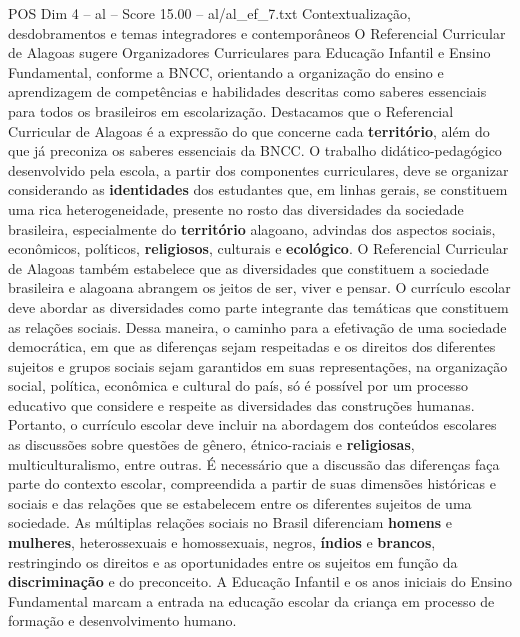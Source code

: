 \begin{textsample}{POS Dim 4 – al – Score 15.00 – al/al\_ef\_7.txt}  \label{ex:f4_pos_049}
Contextualização, desdobramentos e temas integradores e contemporâneos O Referencial Curricular de Alagoas sugere Organizadores Curriculares para Educação Infantil e Ensino Fundamental, conforme a BNCC, orientando a organização do ensino e aprendizagem de competências e habilidades descritas como saberes essenciais para todos os brasileiros em escolarização.
Destacamos que o Referencial Curricular de Alagoas é a expressão do que concerne cada \textbf{território}, além do que já preconiza os saberes essenciais da BNCC.
O trabalho didático-pedagógico desenvolvido pela escola, a partir dos componentes curriculares, deve se organizar considerando as \textbf{identidades} dos estudantes que, em linhas gerais, se constituem uma rica heterogeneidade, presente no rosto das diversidades da sociedade brasileira, especialmente do \textbf{território} alagoano, advindas dos aspectos sociais, econômicos, políticos, \textbf{religiosos}, culturais e \textbf{ecológico}.
O Referencial Curricular de Alagoas também estabelece que as diversidades que constituem a sociedade brasileira e alagoana abrangem os jeitos de ser, viver e pensar.
O currículo escolar deve abordar as diversidades como parte integrante das temáticas que constituem as relações sociais.
Dessa maneira, o caminho para a efetivação de uma sociedade democrática, em que as diferenças sejam respeitadas e os direitos dos diferentes sujeitos e grupos sociais sejam garantidos em suas representações, na organização social, política, econômica e cultural do país, só é possível por um processo educativo que considere e respeite as diversidades das construções humanas.
Portanto, o currículo escolar deve incluir na abordagem dos conteúdos escolares as discussões sobre questões de gênero, étnico-raciais e \textbf{religiosas}, multiculturalismo, entre outras.
É necessário que a discussão das diferenças faça parte do contexto escolar, compreendida a partir de suas dimensões históricas e sociais e das relações que se estabelecem entre os diferentes sujeitos de uma sociedade.
As múltiplas relações sociais no Brasil diferenciam \textbf{homens} e \textbf{mulheres}, heterossexuais e homossexuais, negros, \textbf{índios} e \textbf{brancos}, restringindo os direitos e as oportunidades entre os sujeitos em função da \textbf{discriminação} e do preconceito.
A Educação Infantil e os anos iniciais do Ensino Fundamental marcam a entrada na educação escolar da criança em processo de formação e desenvolvimento humano.

\end{textsample}
